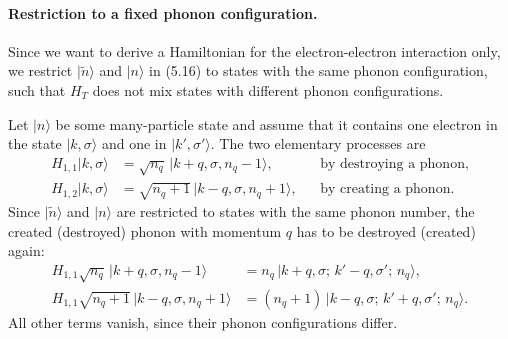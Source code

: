 \documentclass[../../main.tex]{subfiles}
\begin{document}
\paragraph{Restriction to a fixed phonon configuration.}
Since we want to derive a Hamiltonian for the electron-electron interaction only, we
restrict $|\tilde n\rangle$ and $|n\rangle$ in (5.16) to states with the same phonon
configuration, such that $H_T$ does not mix states with different phonon configurations.

Let $|n\rangle$ be some many-particle state and assume that it contains one electron in
the state $|k,\sigma\rangle$ and one in $|k',\sigma'\rangle$. The two elementary
processes are
\begin{align}
H_{1,1}|k,\sigma\rangle &= \sqrt{n_q}\,|k+q,\sigma,n_q-1\rangle,
  &&\text{by destroying a phonon,} \tag{$\ast_1$}\\
H_{1,2}|k,\sigma\rangle &= \sqrt{n_q+1}\,|k-q,\sigma,n_q+1\rangle,
  &&\text{by creating a phonon.} \tag{$\ast_2$}
\end{align}
Since $|\tilde n\rangle$ and $|n\rangle$ are restricted to states with the same phonon
number, the created (destroyed) phonon with momentum $q$ has to be destroyed (created)
again:
\begin{align}
H_{1,1}\sqrt{n_q}\,|k+q,\sigma,n_q-1\rangle
  &= n_q\,|k+q,\sigma;\,k'-q,\sigma';\,n_q\rangle,\\
H_{1,1}\sqrt{n_q+1}\,|k-q,\sigma,n_q+1\rangle
  &= (n_q+1)\,|k-q,\sigma;\,k'+q,\sigma';\,n_q\rangle.
\end{align}
All other terms vanish, since their phonon configurations differ.
\end{document}
